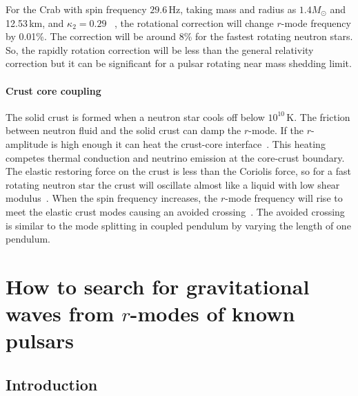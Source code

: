 \documentclass{ttuthes2007}
\begin{document}
For the Crab with spin frequency $29.6$\,Hz, taking mass and radius as
$1.4M_\odot$ and 12.53\,km, and $\kappa_2 = 0.29$~\cite{Lindblom_1999} , the
rotational correction  will change $r$-mode frequency by 0.01\%. The correction
will be around 8\% for the fastest rotating neutron stars. So, the rapidly rotation
correction will be less than the general relativity correction but it can be
significant for a pulsar rotating near mass shedding limit.

\subsubsection{Crust core coupling}
The solid crust is formed when a neutron star cools off below
$10^{10}$\,K. The friction between neutron fluid and the solid crust can damp
the $r$-mode. If the $r$-amplitude is high enough it can heat the crust-core
interface~\cite{Lindblom_2000}. This heating competes thermal
conduction and neutrino emission at the core-crust boundary. The elastic restoring
force on the crust is less than the Coriolis force, so for a fast rotating neutron
star the crust will oscillate almost like a liquid with low shear
modulus~\cite{Levin_2001}. When the spin frequency increases, the $r$-mode
frequency will rise to meet the elastic crust modes causing an avoided
crossing~\cite{Levin_2001}. The avoided crossing is
similar to the mode splitting in coupled pendulum by varying the length of one
pendulum. 


\chapter{How to search for gravitational waves from $r$-modes of known pulsars}
\section{Introduction}
\end{document}
